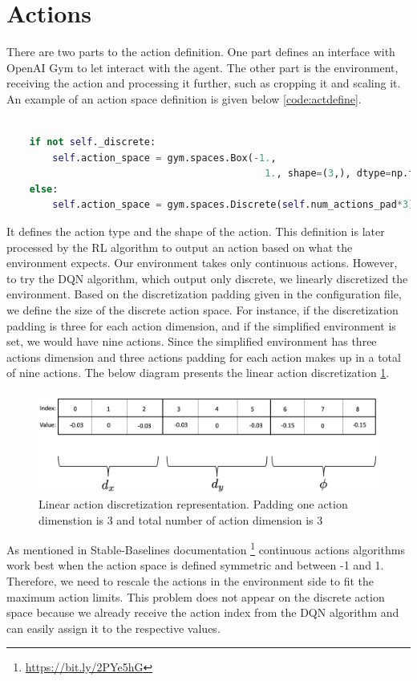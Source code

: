 \section{Actions}

There are two parts to the action definition. One part defines an interface with OpenAI Gym to let interact with the agent. The other part is the environment, receiving the action and processing it further, such as cropping it and scaling it. An example of an action space definition is given below \ref{code:actdefine}. 

\begin{lstlisting}[language=Python, caption=OpenAI gym action space definition, label=code:actdefine]

    if not self._discrete:
        self.action_space = gym.spaces.Box(-1.,
                                             1., shape=(3,), dtype=np.float32)
    else:
        self.action_space = gym.spaces.Discrete(self.num_actions_pad*3)

\end{lstlisting}


It defines the action type and the shape of the action. This definition is later processed by the RL algorithm to output an action based on what the environment expects. Our environment takes only continuous actions. However, to try the DQN algorithm, which output only discrete, we linearly discretized the environment. Based on the discretization padding given in the configuration file, we define the size of the discrete action space. For instance, if the discretization padding is three for each action dimension, and if the simplified environment is set, we would have nine actions. Since the simplified environment has three actions dimension and three actions padding for each action makes up in a total of nine actions. The below diagram presents the linear action discretization \ref{fig:disc}.

\begin{figure}[htbp]
    \centering
    \includegraphics[width=1\textwidth]{figures/discretization.png}
    \caption{Linear action discretization representation. Padding one action dimenstion is 3 and total number of action dimension is 3}
    \label{fig:disc}
\end{figure}

As mentioned in Stable-Baselines documentation \footnote{\url{https://bit.ly/2PYe5hG}} continuous actions algorithms work best when the action space is defined symmetric and between -1 and 1. Therefore, we need to rescale the actions in the environment side to fit the maximum action limits. This problem does not appear on the discrete action space because we already receive the action index from the DQN algorithm and can easily assign it to the respective values.